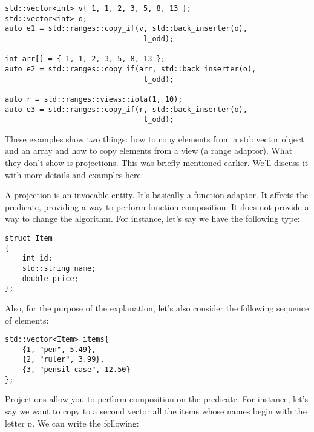 \begin{lstlisting}[style=styleCXX]
std::vector<int> v{ 1, 1, 2, 3, 5, 8, 13 };
std::vector<int> o;
auto e1 = std::ranges::copy_if(v, std::back_inserter(o),
								l_odd);
								
int arr[] = { 1, 1, 2, 3, 5, 8, 13 };
auto e2 = std::ranges::copy_if(arr, std::back_inserter(o),
								l_odd);

auto r = std::ranges::views::iota(1, 10);
auto e3 = std::ranges::copy_if(r, std::back_inserter(o),
								l_odd);
\end{lstlisting}

These examples show two things: how to copy elements from a std::vector object and an array and how to copy elements from a view (a range adaptor). What they don’t show is projections. This was briefly mentioned earlier. We’ll discuss it with more details and examples here.

A projection is an invocable entity. It’s basically a function adaptor. It affects the predicate, providing a way to perform function composition. It does not provide a way to change the algorithm. For instance, let’s say we have the following type:

\begin{lstlisting}[style=styleCXX]
struct Item
{
	int id;
	std::string name;
	double price;
};
\end{lstlisting}

Also, for the purpose of the explanation, let’s also consider the following sequence of elements:

\begin{lstlisting}[style=styleCXX]
std::vector<Item> items{
	{1, "pen", 5.49},
	{2, "ruler", 3.99},
	{3, "pensil case", 12.50}
};
\end{lstlisting}

Projections allow you to perform composition on the predicate. For instance, let’s say we want to copy to a second vector all the items whose names begin with the letter p. We can write the following:

\begin{lstlisting}[style=styleCXX]
std::vector<Item> copies;
std::ranges::copy_if(
	items,
	std::back_inserter(copies),
	[](Item const& i) {return i.name[0] == 'p'; });
\end{lstlisting}

However, we can also write the following equivalent example:

\begin{lstlisting}[style=styleCXX]
std::vector<Item> copies;
std::ranges::copy_if(
	items,
	std::back_inserter(copies),
	[](std::string const& name) {return name[0] == 'p'; },
	&Item::name);
\end{lstlisting}

